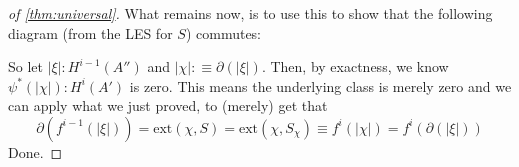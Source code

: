 \begin{proof}[of \cref{thm:universal}]
  What remains now, is to use this to show that the following diagram (from the LES for $S$) commutes:
  \begin{center}
  \end{center}
  So let $|\xi|:H^{i-1}(A'')$ and $|\chi|:\equiv \partial(|\xi|)$.
  Then, by exactness, we know $\psi^\ast(|\chi|):H^i(A')$ is zero.
  This means the underlying class is merely zero and we can apply what we just proved,
  to (merely) get that
  \[ \partial(f^{i-1}(|\xi|))=\mathrm{ext}(\chi,S)=\mathrm{ext}(\chi,S_\chi)\equiv f^i(|\chi|)=f^i(\partial(|\xi|))\]
  Done.
\end{proof}
